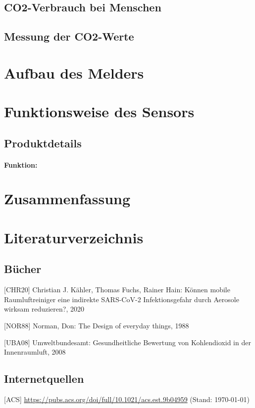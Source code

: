 \documentclass[12pt,a4paper,oneside,english]{article}
\begin{document}
\subsection{CO2-Verbrauch bei Menschen}
\subsection{Messung der CO2-Werte}
\label{lblMessungderWerte}

\newpage
\section{Aufbau des Melders}

\newpage
\section{Funktionsweise des Sensors}
\label{lblFunktionsweisesensor}
\subsection{Produktdetails}
\paragraph{Funktion:}
\section{Zusammenfassung}
\newpage

\section{Literaturverzeichnis}
\subsection{Bücher}

[CHR20] Christian J. Kähler, Thomas Fuchs, Rainer Hain: Können mobile Raumluftreiniger eine indirekte SARS-CoV-2 Infektionsgefahr durch Aerosole wirksam reduzieren?, 2020

[NOR88] Norman, Don: The Design of everyday things, 1988

[UBA08] Umweltbundesamt: Gesundheitliche Bewertung von Kohlendioxid in der Innenraumluft, 2008
\subsection{Internetquellen}

[ACS] \url{https://pubs.acs.org/doi/full/10.1021/acs.est.9b04959} (Stand: \today) 
\end{document}
